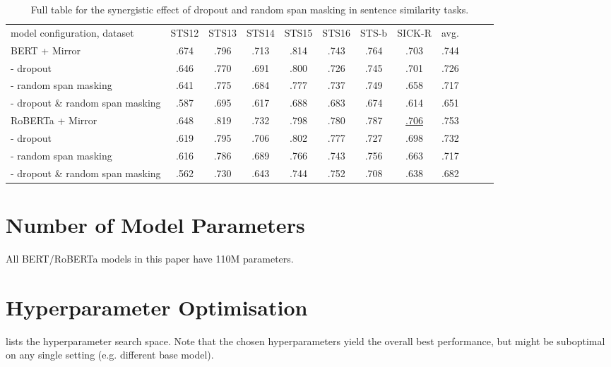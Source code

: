 \documentclass[11pt]{article}
\begin{document}
\begin{table*}[!htbp]
\centering
\small
\begin{tabular}{lccccccclccc}
\cmidrule[1.0pt]{1-10}
model configuration, dataset & STS12 & STS13 & STS14 & STS15 & STS16 & STS-b & SICK-R & avg.\\
\cmidrule[1.0pt]{1-10}
BERT + Mirror & .674 & .796 & .713 & .814 & .743 & .764 & .703 & .744 \\
\hdashline
- dropout & .646 & .770 & .691 & .800 & .726 & .745 & .701 & .726  \\
- random span masking & .641 & .775 & .684 & .777 & .737 & .749 & .658 & .717 \\
- dropout \& random span masking & .587 & .695 & .617 & .688 & .683 & .674 & .614 & .651 \\
\cmidrule[1.0pt]{1-10}
RoBERTa + Mirror & .648 & .819 & .732 & .798 & .780 & .787 & \underline{.706} & .753 \\
\hdashline
 - dropout & .619  & .795 & .706 & .802 & .777 & .727 & .698 & .732 \\
 - random span masking & .616 & .786 & .689 & .766 & .743 & .756 & .663 & .717 \\
 - dropout \& random span masking & .562 & .730 & .643 & .744 & .752 & .708 & .638 & .682 \\
\cmidrule[1.0pt]{1-10}
\end{tabular}
\caption{Full table for the synergistic effect of dropout and random span masking in sentence similarity tasks.}
\label{tab:synersitic_full}
\end{table*}



\section{Number of Model Parameters}\label{sec:appendix_number_param}
All BERT/RoBERTa models in this paper have 110M parameters.

\section{Hyperparameter Optimisation}\label{sec:hyperparameters}
 lists the hyperparameter search space. Note that the chosen hyperparameters yield the overall best performance, but might be suboptimal on any single setting (e.g. different base model). 
\end{document}
